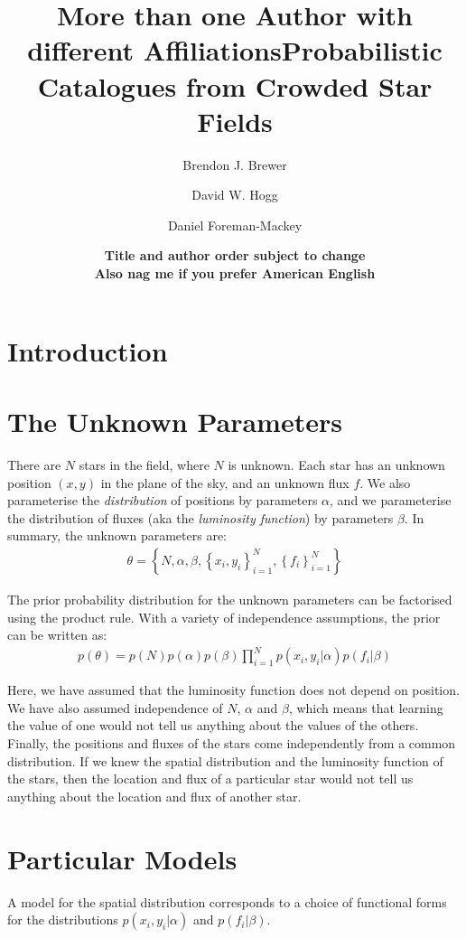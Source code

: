 \documentclass[letterpaper, 11pt]{article}
\title{More than one Author with different Affiliations}
\title{Probabilistic Catalogues from Crowded Star Fields}
\author[1,2]{Brendon J. Brewer}
\author[3]{David W. Hogg}
\author[3]{Daniel Foreman-Mackey}
\affil[1]{UCSB}
\affil[2]{Auckland}
\affil[3]{NYU}
\date{{\bf Title and author order subject to change} \\
{\bf Also nag me if you prefer American English}}
\begin{document}
\maketitle

\section{Introduction}

\section{The Unknown Parameters}
There are $N$ stars in the field, where $N$ is unknown. Each star has an unknown
position $(x,y)$ in the plane of the sky, and an unknown flux $f$. We also
parameterise the {\it distribution} of positions by parameters $\alpha$,
and we parameterise the distribution of fluxes (aka the {\it luminosity
function}) by parameters $\beta$. In summary, the unknown parameters are:
\begin{eqnarray}
\theta = \left\{N, \alpha, \beta, \left\{x_i, y_i\right\}_{i=1}^N, 
\left\{f_i\right\}_{i=1}^N\right\}
\end{eqnarray}

The prior probability distribution for the unknown parameters can be factorised
using the product rule. With a variety of independence assumptions, the prior
can be written as:
\begin{eqnarray}
p(\theta) = p(N)p(\alpha)p(\beta)\prod_{i=1}^N p(x_i, y_i | \alpha)
p(f_i | \beta) 
\end{eqnarray}

Here, we have assumed that the luminosity function does not depend on position.
We have also assumed independence of $N$, $\alpha$ and $\beta$, which means that
learning the value of one would not tell us anything about the values of the
others. Finally, the positions and fluxes of the stars come independently from
a common distribution. If we knew the spatial distribution and the luminosity
function of the stars, then the location and flux of a particular star would not
tell us anything about the location and flux of another star.

\section{Particular Models}
A model for the spatial distribution corresponds to a choice of functional forms
for the distributions $p(x_i, y_i | \alpha)$ and $p(f_i | \beta)$.
\end{document}
